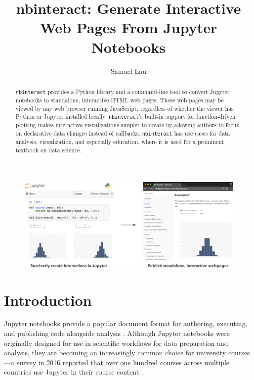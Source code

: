 \documentclass[nobib]{tufte-handout}
\title{nbinteract: Generate Interactive Web Pages From Jupyter Notebooks}
\author[Samuel Lau]{Samuel Lau}
\newcommand{\code}[1]{\texttt{#1}}
\begin{document}
\maketitle%

\begin{figure}[h]
  \includegraphics[width=\linewidth]{graphics/cover.png}
  \label{fig:cover}
\end{figure}

\begin{abstract}
\noindent
\code{nbinteract} provides a Python library and a command-line tool to convert
Jupyter notebooks to standalone, interactive HTML web pages. These web pages
may be viewed by any web browser running JavaScript, regardless of whether the
viewer has Python or Jupyter installed locally. \code{nbinteract}'s built-in
support for function-driven plotting makes interactive visualizations simpler
to create by allowing authors to focus on declarative data changes instead of
callbacks. \code{nbinteract} has use cases for data analysis, visualization,
and especially education, where it is used for a prominent textbook on data
science.
\end{abstract}

\section{Introduction} %
\label{sec:introduction}

Jupyter notebooks provide a popular document format for authoring, executing,
and publishing code alongside analysis \cite{thomas_jupyter_2016}. Although
Jupyter notebooks were originally designed for use in scientific workflows for
data preparation and analysis, they are becoming an increasingly common choice
for university courses---a survey in 2016 reported that over one hundred
courses across multiple countries use Jupyter in their course content
\cite{hamrick_2016_2016}.
\end{document}
